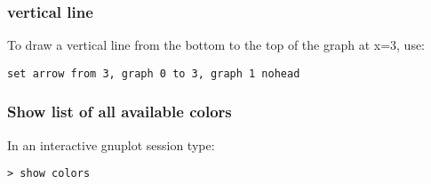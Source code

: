 \subsubsection*{vertical line}

To draw a vertical line from the bottom to the top of the graph at x=3, use: 
\begin{verbatim}
set arrow from 3, graph 0 to 3, graph 1 nohead
\end{verbatim}


\subsubsection*{Show list of all available colors}

In an interactive gnuplot session type:

\begin{verbatim}
> show colors
\end{verbatim}




